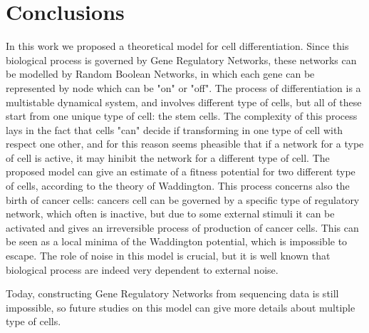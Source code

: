 \chapter*{Conclusions}
\lhead[\fancyplain{}{\bfseries\thepage}]{\fancyplain{}{\bfseries\rightmark}}

In this work we proposed a theoretical model for cell differentiation.
Since this biological process is governed by Gene Regulatory Networks, these networks can be modelled by Random Boolean Networks, in which each gene can be represented by  node which can be "on" or "off".
The process of differentiation is a multistable dynamical system, and involves different type of cells, but all of these start from one unique type of cell: the stem cells. The complexity of this process lays in the fact that cells "can" decide if transforming in one type of cell with respect one other, and for this reason seems pheasible that if a network for a type of cell is active, it may hinibit the network for a different type of cell.
The proposed model can give an estimate of a fitness potential for two different type of cells, according to the theory of Waddington.
This process concerns also the birth of cancer cells: cancers cell can be governed by a specific type of regulatory network, which often is inactive, but due to some external stimuli it can be activated and gives an irreversible process of production of cancer cells. This can be seen as a local minima of the Waddington potential, which is impossible to escape.
The role of noise in this model is crucial, but it is well known that biological process are indeed very dependent to external noise.

Today, constructing Gene Regulatory Networks from sequencing data is still impossible, so future studies on this model can give more details about multiple type of cells.
